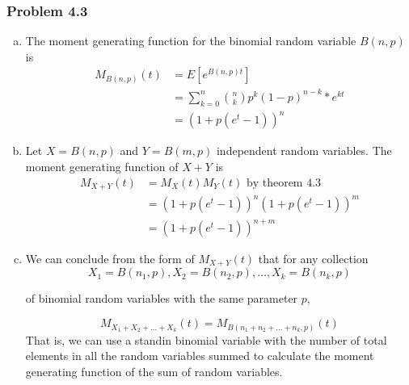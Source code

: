 \documentclass[12pt,letterpaper]{article}
\newenvironment{answer}[1]{
  \subsubsection*{Problem #1}
}{\newpage}
\begin{document}
\begin{answer}{4.3}
\begin{enumerate}[(a)]
	\item The moment generating function for the binomial random variable $B(n,p)$ is
		\begin{align*}
		M_{B(n,p)}(t) &= E[e^{B(n,p)t}] \\
			&= \sum_{k=0}^n {n \choose k} p^k(1-p)^{n-k} * e^{kt}\\
			&= (1 + p(e^t - 1))^n
		\end{align*}
	\item Let $X = B(n,p)$ and $Y = B(m, p)$ independent random variables. The moment generating function of $X + Y$ is
		\begin{align*}
		M_{X + Y}(t) &= M_X(t)M_Y(t) \text{ by theorem 4.3} \\
			&= (1 + p(e^t - 1))^n (1 + p(e^t - 1))^m \\
			&= (1 + p(e^t - 1))^{n + m}
		\end{align*}
	\item We can conclude from the form of $M_{X+Y}(t)$ that for any collection
		$$X_1 = B(n_1, p), X_2 = B(n_2, p), \ldots, X_k = B(n_k, p)$$

		 of binomial random variables with the same parameter $p$,

		 $$M_{X_1 + X_2 + \ldots + X_k}(t) = M_{B(n_1 + n_2 + \ldots + n_k, p)}(t)$$
		 That is, we can use a standin binomial variable with the number of total elements in all the random variables summed to calculate the moment generating function of the sum of random variables.
\end{enumerate}
\end{answer}
\end{document}
